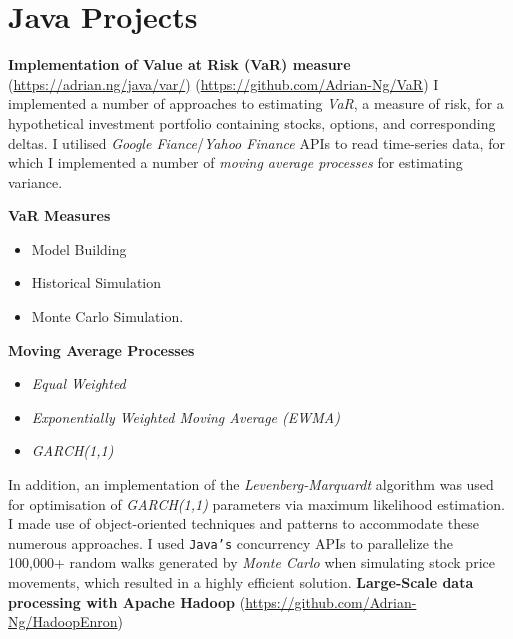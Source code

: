 \documentclass[letterpaper,11pt]{article}
\begin{document}
\section{Java Projects}
\textbf{Implementation of Value at Risk (VaR) measure}
\hfill
\tiny
(\href{https://adrian.ng/java/var/}{https://adrian.ng/java/var/})
\hfill
(\href{https://github.com/Adrian-Ng/VaR}{https://github.com/Adrian-Ng/VaR})
\newline
\small
I implemented a number of approaches to estimating \textit{VaR}, a measure of risk, for a hypothetical investment portfolio containing stocks, options, and corresponding deltas. I utilised \textit{Google Fiance}/\textit{Yahoo Finance} APIs to read time-series data, for which I implemented a number of \textit{moving average processes} for estimating variance.
\begin{multicols}{2}
	\textbf{VaR Measures}
	\begin{itemize}
		\item Model Building
		\item Historical Simulation
		\item Monte Carlo Simulation.
	\end{itemize}
	\columnbreak
	\textbf{Moving Average Processes}
	\begin{itemize}
		\item \textit{Equal Weighted}
		\item \textit{Exponentially Weighted Moving Average (EWMA)}
		\item \textit{GARCH(1,1)}
	\end{itemize}
\end{multicols}
\noindent
In addition, an implementation of the \textit{Levenberg-Marquardt} algorithm was used for optimisation of \textit{GARCH(1,1)} parameters via maximum likelihood estimation.
I made use of object-oriented techniques and patterns to accommodate these numerous approaches.
I used \texttt{Java's} concurrency APIs to parallelize the 100,000+ random walks generated by \textit{Monte Carlo} when simulating stock price movements, which resulted in a highly efficient solution.
\newline \newline
\noindent
\textbf{Large-Scale data processing with Apache Hadoop}
\hfill
\tiny
(\href{https://github.com/Adrian-Ng/HadoopEnron}{https://github.com/Adrian-Ng/HadoopEnron})
\end{document}
